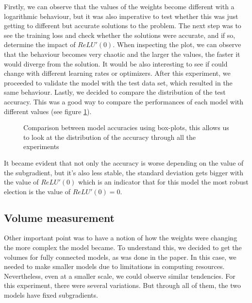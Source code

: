 Firstly, we can observe that the values of the weights become different with a logarithmic behaviour, but it was also imperative to test whether this was just getting to different but accurate solutions to the problem. The next step was to see the training loss and check whether the solutions were accurate, and if so, determine the impact of $ReLU'(0) $. When inspecting the plot, we can observe that the behaviour becomes very chaotic and the larger the values, the faster it would diverge from the solution. It would be also interesting to see if could change with different learning rates or optimizers. After this experiment, we proceeded to validate the model with the test data set, which resulted in the same behaviour. Lastly, we decided to compare the distribution of the test accuracy. This was a good way to compare the performances of each model with different values (see figure \ref{fig:foobar}).  

\begin{figure}[htbp]
    \centering
    \caption{ Comparison between model accuracies using box-plots, this allows us to look at the distribution of the accuracy through all the experiments}
    \label{fig:foobar}
\end{figure}

It became evident that not only the accuracy is worse depending on the value of the subgradient, but it's also less stable, the standard deviation gets bigger with the value of $ReLU'(0)$ which is an indicator that for this model the most robust election is the value of $ReLU'(0) = 0$.

\subsection{Volume measurement}

Other important point was to have a notion of how the weights were changing the more complex the model became. To understand this, we decided to get the volumes for fully connected models, as was done in the paper. In this case, we needed to make smaller models due to limitations in computing resources. Nevertheless, even at a smaller scale, we could observe similar tendencies. For this experiment, there were several variations. But through all of them, the two models have fixed subgradients.

